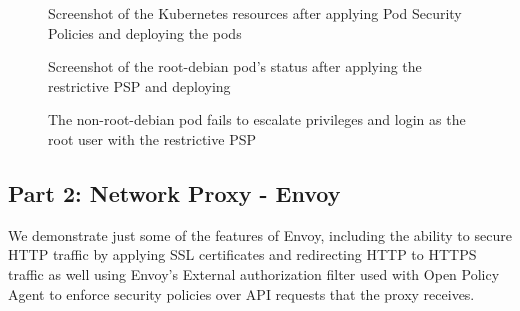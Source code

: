 \begin{figure}[t]
  \begin{center}
    \vspace{-0.2in}
    \caption{Screenshot of the Kubernetes resources after applying Pod Security Policies and deploying the pods}
    \label{fig:psp-k8s-resources}
  \end{center}
\end{figure}

\begin{figure}[t]
  \begin{center}
    \vspace{-0.2in}
    \caption{Screenshot of the root-debian pod's status after applying the restrictive PSP and deploying}
    \label{fig:psp-describe-root}
  \end{center}
\end{figure}

\begin{figure}[t]
  \begin{center}
    \vspace{-0.2in}
    \caption{The non-root-debian pod fails to escalate privileges and login as the root user with the restrictive PSP}
    \label{fig:psp-priv-esc}
  \end{center}
\end{figure}

\twocolumn

\subsection{Part 2: Network Proxy - Envoy}
We demonstrate just some of the features of Envoy, including the ability to secure HTTP traffic by applying SSL
certificates and redirecting HTTP to HTTPS traffic as well using Envoy's External authorization filter
used with Open Policy Agent to enforce security policies over API requests that the proxy receives.

